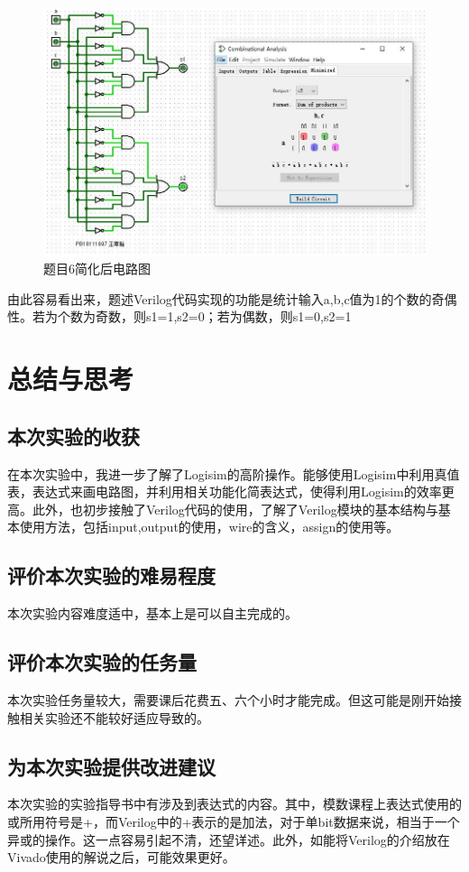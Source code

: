 \documentclass[UTF8]{article}
\begin{document}
	\begin{figure}[H]
		\centering
		\includegraphics[scale=0.6]{Problem6_Curcuit.jpg}
		\caption{题目6简化后电路图}
		\label{Problem6_Curcuit}
	\end{figure}\par
	由此容易看出来，题述Verilog代码实现的功能是统计输入a,b,c值为1的个数的奇偶性。若为个数为奇数，则s1=1,s2=0；若为偶数，则s1=0,s2=1\par
	\section{总结与思考}
	
	\subsection{本次实验的收获}
	在本次实验中，我进一步了解了Logisim的高阶操作。能够使用Logisim中利用真值表，表达式来画电路图，并利用相关功能化简表达式，使得利用Logisim的效率更高。此外，也初步接触了Verilog代码的使用，了解了Verilog模块的基本结构与基本使用方法，包括input,output的使用，wire的含义，assign的使用等。\par
	
	\subsection{评价本次实验的难易程度}
	本次实验内容难度适中，基本上是可以自主完成的。\par
	
	\subsection{评价本次实验的任务量}
	本次实验任务量较大，需要课后花费五、六个小时才能完成。但这可能是刚开始接触相关实验还不能较好适应导致的。\par
	
	\subsection{为本次实验提供改进建议}
	本次实验的实验指导书中有涉及到表达式的内容。其中，模数课程上表达式使用的或所用符号是+，而Verilog中的+表示的是加法，对于单bit数据来说，相当于一个异或的操作。这一点容易引起不清，还望详述。此外，如能将Verilog的介绍放在Vivado使用的解说之后，可能效果更好。
	
\end{document}
